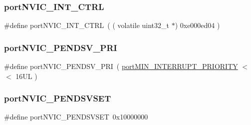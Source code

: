 \mbox{\label{thirdparty_2freertos_2freertos-10_80_80_2_source_2portable_2_g_c_c_2_a_r_m___c_m0_2port_8c_a947759849fc561d70f3bad8a15f5737c}} 
\subsubsection{\texorpdfstring{portNVIC\_INT\_CTRL}{portNVIC\_INT\_CTRL}}
{\footnotesize\ttfamily \#define port\+N\+V\+I\+C\+\_\+\+I\+N\+T\+\_\+\+C\+T\+RL~( ( volatile uint32\+\_\+t $\ast$) 0xe000ed04 )}

\mbox{\label{thirdparty_2freertos_2freertos-10_80_80_2_source_2portable_2_g_c_c_2_a_r_m___c_m0_2port_8c_a71a0b2492ed73217b5864c1e3ba8c9be}} 
\subsubsection{\texorpdfstring{portNVIC\_PENDSV\_PRI}{portNVIC\_PENDSV\_PRI}}
{\footnotesize\ttfamily \#define port\+N\+V\+I\+C\+\_\+\+P\+E\+N\+D\+S\+V\+\_\+\+P\+RI~( \mbox{\hyperlink{thirdparty_2freertos_2freertos-10_80_80_2_source_2portable_2_g_c_c_2_a_r_m___c_m0_2port_8c_a7695fa51586f81228c89bcf517ec44f3}{port\+M\+I\+N\+\_\+\+I\+N\+T\+E\+R\+R\+U\+P\+T\+\_\+\+P\+R\+I\+O\+R\+I\+TY}} $<$$<$ 16\+U\+L )}

\mbox{\label{thirdparty_2freertos_2freertos-10_80_80_2_source_2portable_2_g_c_c_2_a_r_m___c_m0_2port_8c_a1428ef16ad26ab8c4d4172aedb8c019b}} 
\subsubsection{\texorpdfstring{portNVIC\_PENDSVSET}{portNVIC\_PENDSVSET}}
{\footnotesize\ttfamily \#define port\+N\+V\+I\+C\+\_\+\+P\+E\+N\+D\+S\+V\+S\+ET~0x10000000}

